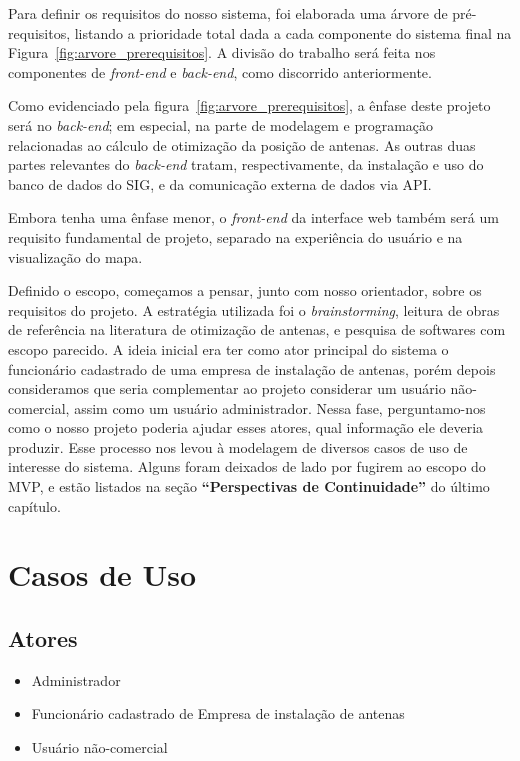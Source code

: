 \documentclass[]{politex}
\begin{document}
Para definir os requisitos do nosso sistema, foi elaborada uma árvore de
pré-requisitos, listando a prioridade total dada a cada componente do sistema
final na Figura~\ref{fig:arvore_prerequisitos}. A divisão do trabalho será
feita nos componentes de \textit{front-end} e \textit{back-end}, como discorrido
anteriormente.

Como evidenciado pela figura~\ref{fig:arvore_prerequisitos}, a ênfase deste projeto será no \textit{back-end};
em especial, na parte de modelagem e programação relacionadas ao cálculo de
otimização da posição de antenas. As outras duas partes relevantes do
\textit{back-end} tratam, respectivamente, da instalação e uso do banco de dados do SIG, e
da comunicação externa de dados via API.

Embora tenha uma ênfase menor, o \textit{front-end} da interface web também será
um requisito fundamental de projeto, separado na experiência do usuário e na
visualização do mapa.

Definido o escopo, começamos a pensar, junto com nosso orientador, sobre os
requisitos do projeto. A estratégia utilizada foi o \textit{brainstorming}, leitura de
obras de referência na literatura de otimização de antenas, e pesquisa de softwares com escopo parecido.
A ideia inicial era ter como ator principal do sistema o funcionário cadastrado
de uma empresa de instalação de antenas, porém depois consideramos que seria
complementar ao projeto considerar um usuário não-comercial, assim
como um usuário administrador. Nessa fase, perguntamo-nos como o nosso projeto
poderia ajudar esses atores, qual informação ele deveria produzir. Esse processo
nos levou à modelagem de diversos casos de uso de interesse do sistema. Alguns
foram deixados de lado por fugirem ao escopo do MVP, e estão listados na seção
\textbf{``Perspectivas de Continuidade''} do último capítulo.

\section{Casos de Uso}

\newcommand{\usecase}[1]{\refstepcounter{usecasecounter}\label{usecase:#1}\arabic{usecasecounter}}

\subsection{Atores}
\begin{itemize}
\item Administrador
\item Funcionário cadastrado de Empresa de instalação de antenas
\item Usuário não-comercial
\end{itemize}
\end{document}
